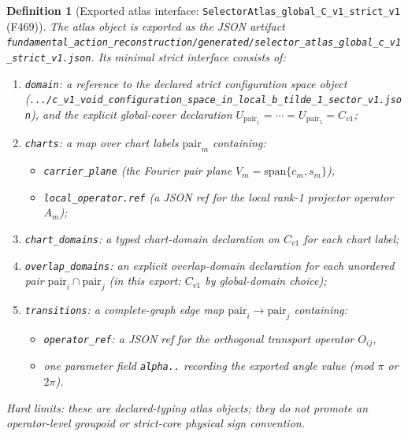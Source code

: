 \documentclass[11pt,a4paper]{article}
\newtheorem{definition}{Definition}[section]
\begin{document}
\begin{definition}[Exported atlas interface: \texttt{SelectorAtlas\_global\_C\_v1\_strict\_v1} (F469)]
The atlas object is exported as the JSON artifact
\verb|fundamental_action_reconstruction/generated/selector_atlas_global_c_v1_strict_v1.json|.
Its minimal strict interface consists of:
\begin{enumerate}[label=\arabic*.]
  \item \texttt{domain}: a reference to the declared strict configuration space object
  (\verb|.../c_v1_void_configuration_space_in_local_b_tilde_1_sector_v1.json|),
  and the explicit global-cover declaration $U_{\mathrm{pair}_1}=\cdots=U_{\mathrm{pair}_5}=C_{v1}$;
  \item \texttt{charts}: a map over chart labels $\mathrm{pair}_m$ containing:
  \begin{itemize}
    \item \texttt{carrier\_plane} (the Fourier pair plane $V_m=\mathrm{span}\{c_m,s_m\}$),
    \item \texttt{local\_operator.ref} (a JSON ref for the local rank-1 projector operator $A_m$);
  \end{itemize}
  \item \texttt{chart\_domains}: a typed chart-domain declaration on $C_{v1}$ for each chart label;
  \item \texttt{overlap\_domains}: an explicit overlap-domain declaration for each unordered pair
  $\mathrm{pair}_i\cap \mathrm{pair}_j$ (in this export: $C_{v1}$ by global-domain choice);
  \item \texttt{transitions}: a complete-graph edge map $\mathrm{pair}_i\to \mathrm{pair}_j$ containing:
  \begin{itemize}
    \item \texttt{operator\_ref}: a JSON ref for the orthogonal transport operator $O_{ij}$,
    \item one parameter field \texttt{alpha..} recording the exported angle value (mod $\pi$ or $2\pi$).
  \end{itemize}
\end{enumerate}
\emph{Hard limits:} these are declared-typing atlas objects; they do not promote an operator-level groupoid or strict-core physical sign convention.
\end{definition}
\end{document}
